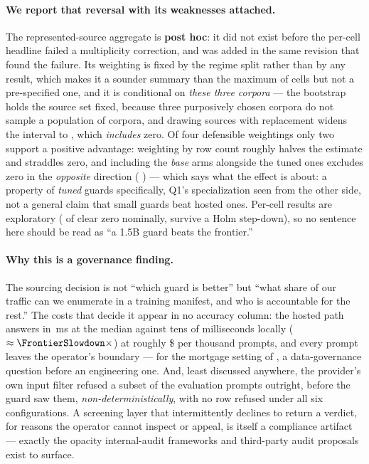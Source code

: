\documentclass[manuscript,screen,review,anonymous]{acmart}
\begin{document}
\paragraph{We report that reversal with its weaknesses attached.} The represented-source aggregate is
\textbf{post hoc}: it did not exist before the per-cell headline failed a multiplicity correction, and was
added in the same revision that found the failure. Its weighting is fixed by the regime split rather than
by any result, which makes it a sounder summary than the maximum of \HtwoNCells{} cells but not a
pre-specified one, and it is conditional on \emph{these three corpora} --- the bootstrap holds the source
set fixed, because three purposively chosen corpora do not sample a population of corpora, and drawing
sources with replacement widens the interval to \HtwoAggSrcResampledCI, which \emph{includes} zero. Of
four defensible weightings only two support a positive advantage: weighting by row count roughly halves
the estimate and straddles zero, and including the \emph{base} arms alongside the tuned ones excludes zero
in the \emph{opposite} direction (\HtwoAggWithBaseTpr{} \HtwoAggWithBaseTprCI) --- which says what the
effect is about: a property of \emph{tuned} guards specifically, Q1's specialization seen from the other
side, not a general claim that small guards beat hosted ones. Per-cell results are exploratory
(\HtwoNSigNominal{} of \HtwoNCells{} clear zero nominally, \HtwoNSigHolm{} survive a Holm step-down), so
no sentence here should be read as ``a 1.5B guard beats the frontier.''

\paragraph{Why this is a governance finding.} The sourcing decision is not ``which guard is better'' but
``what share of our traffic can we enumerate in a training manifest, and who is accountable for the
rest.'' The costs that decide it appear in no accuracy column: the hosted path answers in
\FrontierBestMedianMs\,ms at the median against tens of milliseconds locally
($\approx\FrontierSlowdown\times$) at roughly \$\FrontierBestCost{} per thousand prompts, and every
prompt leaves the operator's boundary --- for the mortgage setting of , a
data-governance question before an engineering one. And, least discussed anywhere, the provider's own
input filter refused a subset of the evaluation prompts outright, before the guard saw them,
\emph{non-deterministically}, with no row refused under all six configurations. A screening layer that
intermittently declines to return a verdict, for reasons the operator cannot inspect or appeal, is
itself a compliance artifact --- exactly the opacity internal-audit frameworks \citep{raji2020closing}
and third-party audit proposals \citep{raji2022outsider} exist to surface.
\end{document}
